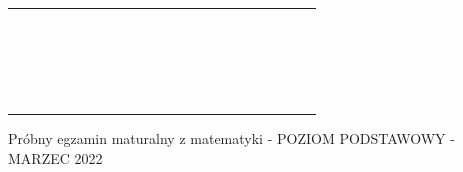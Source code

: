\documentclass[10pt]{article}
\begin{document}
\begin{center}
\begin{tabular}{|c|c|c|c|c|c|c|c|c|c|c|c|c|c|c|c|c|c|c|c|c|c|}
\hline
 &  &  &  &  &  &  &  &  &  &  &  &  &  &  &  &  &  &  &  &  &  \\
\hline
 &  &  &  &  &  &  &  &  &  &  &  &  &  &  &  &  &  &  &  &  &  \\
\hline
 &  &  &  &  &  &  &  &  &  &  &  &  &  &  &  &  &  &  &  &  &  \\
\hline
 &  &  &  &  &  &  &  &  &  &  &  &  &  &  &  &  &  &  &  &  &  \\
\hline
 &  &  &  &  &  &  &  &  &  &  &  &  &  &  &  &  &  &  &  &  &  \\
\hline
 &  &  &  &  &  &  &  &  &  &  &  &  &  &  &  &  &  &  &  &  &  \\
\hline
 &  &  &  &  &  &  &  &  &  &  &  &  &  &  &  &  &  &  &  &  &  \\
\hline
 &  &  &  &  &  &  &  &  &  &  &  &  &  &  &  &  &  &  &  &  &  \\
\hline
 &  &  &  &  &  &  &  &  &  &  &  &  &  &  &  &  &  &  &  &  &  \\
\hline
 &  &  &  &  &  &  &  &  &  &  &  &  &  &  &  &  &  &  &  &  &  \\
\hline
 &  &  &  &  &  &  &  &  &  &  &  &  &  &  &  &  &  &  &  &  &  \\
\hline
 &  &  &  &  &  &  &  &  &  &  &  &  &  &  &  &  &  &  &  &  &  \\
\hline
 &  &  &  &  &  &  &  &  &  &  &  &  &  &  &  &  &  &  &  &  &  \\
\hline
 &  &  &  &  &  &  &  &  &  &  &  &  &  &  &  &  &  &  &  &  &  \\
\hline
 &  &  &  &  &  &  &  &  &  &  &  &  &  &  &  &  &  &  &  &  &  \\
\hline
 &  &  &  &  &  &  &  &  &  &  &  &  &  &  &  &  &  &  &  &  &  \\
\hline
 &  &  &  &  &  &  &  &  &  &  &  &  &  &  &  &  &  &  &  &  &  \\
\hline
 &  &  &  &  &  &  &  &  &  &  &  &  &  &  &  &  &  &  &  &  &  \\
\hline
 &  &  &  &  &  &  &  &  &  &  &  &  &  &  &  &  &  &  &  &  &  \\
\hline
 &  &  &  &  &  &  &  &  &  &  &  &  &  &  &  &  &  &  &  &  &  \\
\hline
 &  &  &  &  &  &  &  &  &  &  &  &  &  &  &  &  &  &  &  &  &  \\
\hline
\end{tabular}
\end{center}

Próbny egzamin maturalny z matematyki - POZIOM PODSTAWOWY - MARZEC 2022
\end{document}
